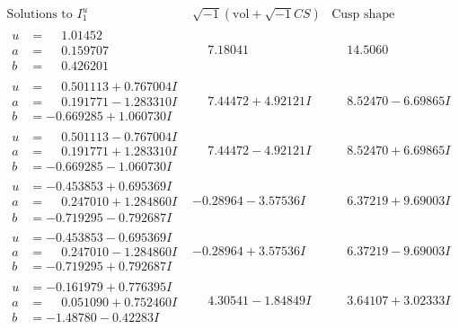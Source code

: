 \documentclass[1p]{elsarticle_modified}
\theoremstyle{definition}
\newcommand{\I}{\sqrt{-1}}
\begin{document}
$$\begin{array}{c|c|c}  
\text{Solutions to }I^u_{1}& \I (\text{vol} + \sqrt{-1}CS) & \text{Cusp shape}\\
 \hline 
\begin{aligned}
u &= \phantom{-}1.01452\phantom{ +0.000000I} \\
a &= \phantom{-}0.159707\phantom{ +0.000000I} \\
b &= \phantom{-}0.426201\phantom{ +0.000000I}\end{aligned}
 & \phantom{-}7.18041\phantom{ +0.000000I} & \phantom{-}14.5060\phantom{ +0.000000I} \\ \hline\begin{aligned}
u &= \phantom{-}0.501113 + 0.767004 I \\
a &= \phantom{-}0.191771 - 1.283310 I \\
b &= -0.669285 + 1.060730 I\end{aligned}
 & \phantom{-}7.44472 + 4.92121 I & \phantom{-}8.52470 - 6.69865 I \\ \hline\begin{aligned}
u &= \phantom{-}0.501113 - 0.767004 I \\
a &= \phantom{-}0.191771 + 1.283310 I \\
b &= -0.669285 - 1.060730 I\end{aligned}
 & \phantom{-}7.44472 - 4.92121 I & \phantom{-}8.52470 + 6.69865 I \\ \hline\begin{aligned}
u &= -0.453853 + 0.695369 I \\
a &= \phantom{-}0.247010 + 1.284860 I \\
b &= -0.719295 - 0.792687 I\end{aligned}
 & -0.28964 - 3.57536 I & \phantom{-}6.37219 + 9.69003 I \\ \hline\begin{aligned}
u &= -0.453853 - 0.695369 I \\
a &= \phantom{-}0.247010 - 1.284860 I \\
b &= -0.719295 + 0.792687 I\end{aligned}
 & -0.28964 + 3.57536 I & \phantom{-}6.37219 - 9.69003 I \\ \hline\begin{aligned}
u &= -0.161979 + 0.776395 I \\
a &= \phantom{-}0.051090 + 0.752460 I \\
b &= -1.48780 - 0.42283 I\end{aligned}
 & \phantom{-}4.30541 - 1.84849 I & \phantom{-}3.64107 + 3.02333 I \\ \hline\begin{aligned}

\end{aligned}
\end{array}$$
\end{document}
